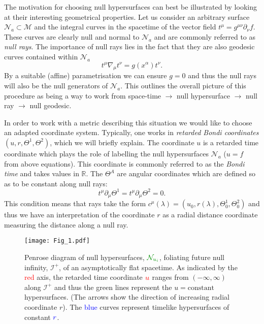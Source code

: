 \documentclass[a4paper,11pt]{article}
\numberwithin{equation}{section}
\begin{document}
The motivation for choosing null hypersurfaces can best be illustrated by looking at their interesting geometrical properties. Let us consider an arbitrary surface $\mathcal{N}_a \subset \mathcal{M}$ and the integral curves in the spacetime of the vector field $t^{\mu}=g^{\mu \nu} \partial_{\nu} f$. These curves are clearly null and normal to $\mathcal{N}_a$ and are commonly referred to as \textit{null rays}. The importance of null rays lies in the fact that they are also geodesic curves contained within $\mathcal{N}_a$ %
\begin{equation}
t^{\mu} \nabla_{\mu} t^{\nu}= g(x^{\alpha}) t^{\nu}.
\end{equation}
By a suitable (affine) parametrisation we can ensure $g=0$ and thus the null rays will also be the null generators of $\mathcal{N}_a$. This outlines the overall picture of this procedure as being a way to work from space-time $\rightarrow$ null hypersurface $\rightarrow$ null ray $\rightarrow$ null geodesic.

In order to work with a metric describing this situation we would like to choose an adapted coordinate system. Typically, one works in \textit{retarded Bondi coordinates} $(u,r,\Theta^1,\Theta^2)$, which we will briefly explain. The coordinate $u$ is a retarded time coordinate which plays the role of labelling the null hypersurfaces $\mathcal{N}_a$ ($u=f$ from above equations). This coordinate is commonly referred to as the \textit{Bondi time} and takes values in $\mathbb{R}$. The $\Theta^A$ are angular coordinates which are defined so as to be constant along null rays:
\begin{equation}
t^{\mu} \partial_{\mu} \Theta^1=t^{\mu} \partial_{\mu} \Theta^2 = 0.
\end{equation}
This condition means that rays take the form $c^{\mu}(\lambda)=(u_0, r(\lambda),\Theta^1_0, \Theta^2_0)$ and thus we have an interpretation of the coordinate $r$ as a radial distance coordinate measuring the distance along a null ray.

\begin{figure}[H]
\begin{center}
	\texttt{[image: Fig\_1.pdf]}
	\caption{Penrose diagram of null hypersurfaces, $\color{islamicgreen}{\mathcal{N}_{u_i}}$, 	foliating future null infinity, $\mathscr{I^+}$, of an asymptotically flat spacetime. As indicated 	by the \textcolor{red}{red} axis, the retarded time coordinate $\color{red}{u}$ ranges from $(-	\infty, \infty)$ along $\mathscr{I^+}$ and thus the \textcolor{islamicgreen}{green} lines 		represent the $u=\text{constant}$ hypersurfaces. (The arrows show the direction of increasing 	radial coordinate $r$). The \textcolor{blue}{blue} curves represent timelike hypersurfaces of 	constant $\textcolor{blue}{r}$. }
\end{center}	
\end{figure}
\end{document}
